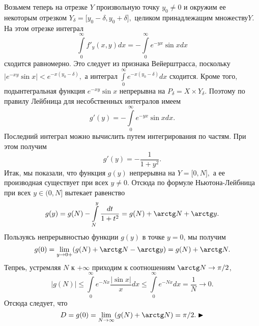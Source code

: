 Возьмем теперь на отрезке $Y$ произвольную точку $y_0\ne 0$ и окружим ее некоторым отрезком $ Y_\delta=\lbrack y_0-\delta,y_0+\delta\rbrack,$ целиком принадлежащим множеству$Y$. На этом отрезке интеграл
$$\int\limits_0^\infty f'_y(x,y)dx=-\int\limits_0^\infty e^{-yx}\sin xdx$$
сходится равномерно. Это следует из признака Вейерштрасса, поскольку $|e^{-xy}\sin x|< e^{-x(y_0-\delta)},$  а интеграл $ \int\limits_0^\infty e^{-x(y_0-\delta)}dx$ сходится. Кроме того, подынтегральная функция $e^{-xy}\sin x$ непрерывна на $ P_\delta = X\times Y_\delta.$ Поэтому по правилу Лейбница для несобственных интегралов имеем 
$$ g'(y) = -\int\limits_0^\infty e^{-yx}\sin xdx.$$
Последний интеграл можно вычислить путем интегрирования по частям. При этом получим
$$ g'(y)=-\frac{1}{1+y^2}.$$
Итак, мы показали, что функция $g(y)$ непрерывна на $ Y = \lbrack 0,N\rbrack,$ а ее производная существует при всех $y\ne 0$. Отсюда по формуле Ньютона-Лейбница при всех $y\in(0,N]$ вытекает равенство
$$ g(y) = g(N) - \int\limits_N^y \frac{dt}{1+t^2}=g(N)+\arctg N+\arctg y.$$
Пользуясь непрерывностью функции $g(y)$ в точке $y=0$, мы получим
$$ g(0)=\lim_{y\to 0+}(g(N)+ \arctg N-\arctg y)=g(N)+\arctg N.$$
Тепреь, устремляя $N$ к $+\infty$ приходим к соотношениям $\arctg N \to \pi/2$,
$$ |g(N)|\le\int\limits_0^\infty e^{-Nx}\frac{|\sin x|}{x}dx\le \int\limits_0^\infty e^{-Nx}dx=\frac1N\to 0.$$
Отсюда следует, что
$$ D=g(0)=\lim_{N\to\infty}(g(N)+\arctg N)=\pi/2. \blacktriangleright$$

